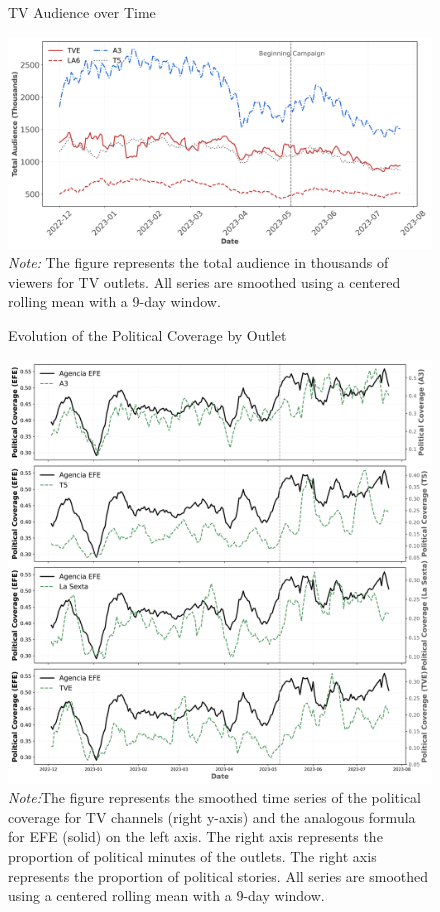 \documentclass[12pt]{article}
\begin{document}
	
	
	
	\begin{figure}[!htb]
		\caption{TV Audience over Time}
		\centering
		\includegraphics[width=150mm]{figures/tv_audience_total}
		\caption*{\small \textit{Note:} The figure represents the total audience in thousands of viewers for TV outlets. All series are smoothed using a centered rolling mean with a 9-day window.}
		\label{fig:audience_total}
	\end{figure}
	
	

	
	
		\begin{figure}[!htb]
		\caption{Evolution of the Political Coverage by Outlet}
		\centering
		\includegraphics[width=150mm]{figures/tv_vs_efe_political_by_channel}
		\caption*{\small \textit{Note:}The figure represents the smoothed time series of the political coverage for TV channels (right y-axis) and the analogous formula for  EFE (solid) on the left axis. The right axis represents the proportion of political minutes of the outlets. The right axis represents the proportion of political stories.   All series are smoothed using a centered rolling mean with a 9-day window.}
		\label{fig:political_by_channel}
	\end{figure}
	
\end{document}
